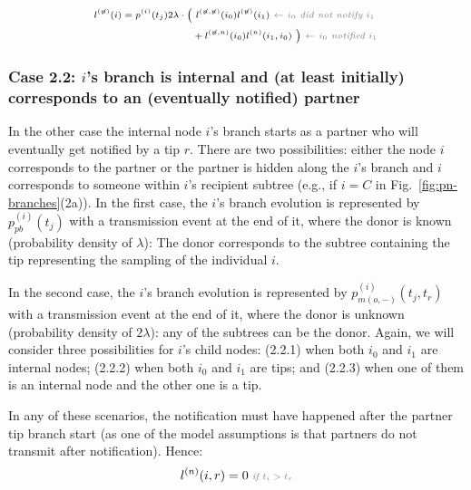 \documentclass[a4paper,10pt]{article}
\begin{document}
\begin{equation}
\scriptsize
\begin{split}
l^{(\not{n})}(i) = p^{(i)}(t_j) 2\lambda \cdot 
\Big(&~l^{(\not{n},\not{n})}(i_0)l^{(\not{n})}(i_1) \textit{\color{gray}~$\leftarrow$ $i_0$ did not notify $i_1$ } \\
&+ l^{(\not{n},n)}(i_0)l^{(n)}(i_1,i_0)~\Big) \textit{\color{gray}~$\leftarrow$ $i_0$ notified $i_1$} \\
\end{split}\label{eq:lu-int-tip}
\end{equation}

\subsubsection*{Case 2.2: $i$'s branch is internal and (at least initially) corresponds to an (eventually notified) partner} 

In the other case the internal node $i$'s branch starts as a partner who will eventually get notified by a tip $r$.
There are two possibilities: either the node $i$ corresponds to the partner or the partner is hidden along the $i$'s branch and $i$ corresponds to someone within $i$'s recipient subtree (e.g., if $i=C$ in Fig.~\ref{fig:pn-branches}(2a)). In the first case, the $i$'s branch evolution is represented by $p_{pb}^{(i)}(t_j)$ with a transmission event at the end of it, where the donor is known (probability density of $\lambda$): The donor corresponds to the subtree containing the tip representing the sampling of the individual $i$.

In the second case, the $i$'s branch evolution is represented by $p_{m(o,-)}^{(i)}(t_j,t_r)$ with a transmission event at the end of it, where the donor is unknown (probability density of $2\lambda$): any of the subtrees can be the donor.
Again, we will consider three possibilities for $i$'s child nodes: (2.2.1) when both $i_0$ and $i_1$ are internal nodes; (2.2.2) when both $i_0$ and $i_1$ are tips; and (2.2.3) when one of them is an internal node and the other one is a tip.

In any of these scenarios, the notification must have happened after the partner tip branch start (as one of the model assumptions is that partners do not transmit after notification). Hence:
\begin{equation}
\scriptsize
l^{(n)}(i, r) = 0 \textit{\color{gray}~if $t_i > t_r$} \\
\label{eq:lp-zero}
\end{equation}
\end{document}
